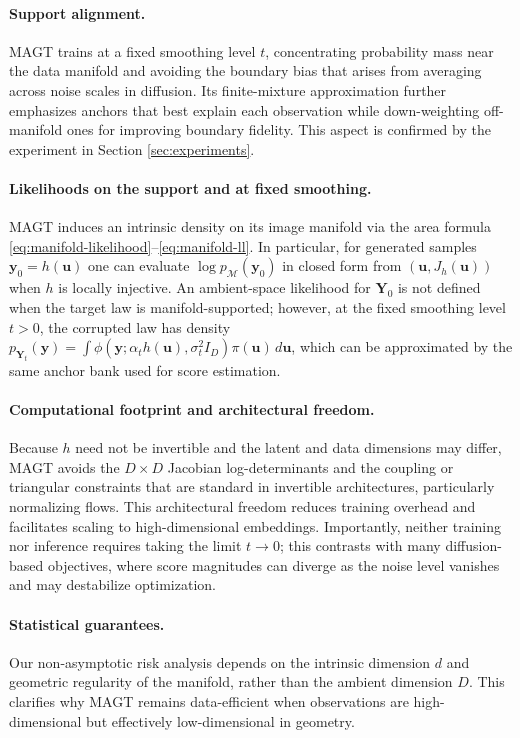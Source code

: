 \documentclass[12pt]{article}
\theoremstyle{definition} %
\newcommand{\M}{\mathcal{M}}
\newcommand{\Y}{\bm Y}
\newcommand{\y}{\bm y}
\providecommand{\method}{MAGT} %
\begin{document}
\paragraph{Support alignment.} \method{} trains at a fixed smoothing level $t$, concentrating probability mass near the data manifold and avoiding the boundary bias that arises from averaging across noise scales in diffusion. Its finite-mixture approximation further emphasizes anchors that best explain each observation while down-weighting off-manifold ones for improving boundary fidelity.
This aspect is confirmed by the experiment in Section \ref{sec:experiments}.

\paragraph{Likelihoods on the support and at fixed smoothing.}
\method{} induces an intrinsic density on its image manifold via the area formula \eqref{eq:manifold-likelihood}--\eqref{eq:manifold-ll}. In particular, for generated samples $\y_0=h(\bm u)$ one can evaluate $\log p_{\M}(\y_0)$ in closed form from $(\bm u,J_h(\bm u))$ when $h$ is locally injective.
An ambient-space likelihood for $\Y_0$ is not defined when the target law is manifold-supported; however, at the fixed smoothing level $t>0$, the corrupted law has density
\(p_{\Y_t}(\y)=\int \phi\!\left(\y;\alpha_t h(\bm u),\sigma_t^2 I_D\right)\pi(\bm u)\,d\bm u\),
which can be approximated by the same anchor bank used for score estimation.

\paragraph{Computational footprint and architectural freedom.}
Because $h$ need not be invertible and the latent and data dimensions may differ, \method{} avoids the $D \times D$ Jacobian log-determinants and the coupling or triangular constraints that are standard in invertible architectures, particularly normalizing flows. This architectural freedom reduces training overhead and facilitates scaling to high-dimensional embeddings. Importantly, neither training nor inference requires taking the limit $t \!\to\! 0$; this contrasts with many diffusion-based objectives, where score magnitudes can diverge as the noise level vanishes and may destabilize optimization.

\paragraph{Statistical guarantees.} Our non-asymptotic risk analysis depends on the intrinsic dimension $d$ and geometric regularity of the manifold, rather than the ambient dimension $D$. This clarifies why \method{} remains data-efficient when observations are high-dimensional but effectively low-dimensional in geometry.
\end{document}
